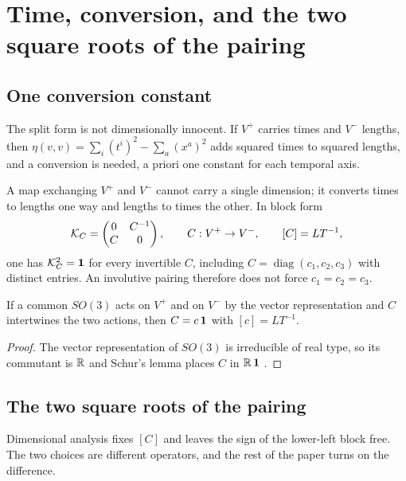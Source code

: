\section{Time, conversion, and the two square roots of the pairing}
\label{sec:clock}

\subsection{One conversion constant}

The split form is not dimensionally innocent. If $V^+$ carries times and $V^-$ lengths, then
$\eta(v,v)=\sum_i(t^i)^2-\sum_a(x^a)^2$ adds squared times to squared lengths, and a conversion is needed, a priori one
constant for each temporal axis.

\begin{proposition}
\label{prop:KC}
A map exchanging $V^+$ and $V^-$ cannot carry a single dimension; it converts times to lengths one way and lengths to times
the other. In block form
\begin{equation}
\label{eq:KC}
\mathcal K_C=\begin{pmatrix}0&C^{-1}\\ C&0\end{pmatrix},\qquad C:V^+\to V^-,\qquad [C]=LT^{-1},
\end{equation}
one has $\mathcal K_C^2=\mathbf 1$ for every invertible $C$, including $C=\operatorname{diag}(c_1,c_2,c_3)$ with distinct entries. An
involutive pairing therefore does not force $c_1=c_2=c_3$.
\end{proposition}

\begin{theorem}
\label{thm:onec}
If a common $SO(3)$ acts on $V^+$ and on $V^-$ by the vector representation and $C$ intertwines the two actions, then
$C=c\,\mathbf 1$ with $[c]=LT^{-1}$.
\end{theorem}

\begin{proof}
The vector representation of $SO(3)$ is irreducible of real type, so its commutant is $\mathbb{R}$ and Schur's lemma places $C$ in
$\mathbb{R}\,\mathbf 1$ \cite{GoodmanWallach}.
\end{proof}

\subsection{The two square roots of the pairing}

Dimensional analysis fixes $[C]$ and leaves the sign of the lower-left block free. The two choices are different operators,
and the rest of the paper turns on the difference.

